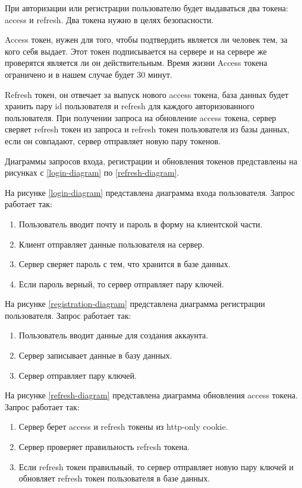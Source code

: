 При авторизации или регистрации пользователю будет выдаваться два токена: access и refresh. Два токена нужно в целях безопасности.

Access токен, нужен для того, чтобы подтвердить является ли человек тем, за кого себя выдает. Этот токен подписывается на сервере и на сервере же проверятся является ли он действительным. Время жизни Access токена ограничено и в нашем случае будет 30 минут.

Refresh токен, он отвечает за выпуск нового access токена, база данных будет хранить пару id пользователя и refresh для каждого авторизованного пользователя. При получении запроса на обновление access токена, сервер сверяет refresh токен из запроса и refresh токен пользователя из базы данных, если он совпадают, сервер отправляет новую пару токенов.

Диаграммы запросов входа, регистрации и обновления токенов представлены на рисунках с \ref{login-diagram} по \ref{refresh-diagram}.

На рисунке \ref{login-diagram} представлена диаграмма входа пользователя. Запрос работает так:
\begin{enumerate}
    \item Пользователь вводит почту и пароль в форму на клиентской части.
    \item Клиент отправляет данные пользователя на сервер.
    \item Сервер сверяет пароль с тем, что хранится в базе данных.
    \item Если пароль верный, то сервер отправляет пару ключей.
\end{enumerate}


На рисунке \ref{registration-diagram} представлена диаграмма регистрации пользователя. Запрос работает так:
\begin{enumerate}
    \item Пользователь вводит данные для создания аккаунта.
    \item Сервер записывает данные в базу данных.
    \item Сервер отправляет пару ключей.
\end{enumerate}


На рисунке \ref{refresh-diagram} представлена диаграмма обновления access токена. Запрос работает так:
\begin{enumerate}
    \item Сервер берет access и refresh токены из http-only cookie.
    \item Сервер проверяет правильность refresh токена.
    \item Если refresh токен правильный, то сервер отправляет новую пару ключей и обновляет refresh токен пользователя в базе данных.
\end{enumerate}


